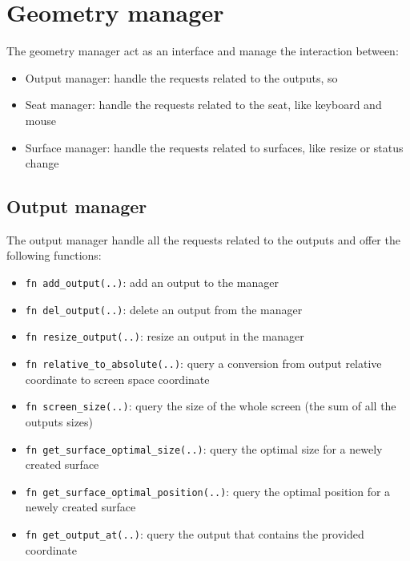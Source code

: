 \section{Geometry manager}
The geometry manager act as an interface and manage the interaction between:
\begin{itemize}
	\item Output manager: handle the requests related to the outputs, so 
	\item Seat manager: handle the requests related to the seat, like keyboard and mouse
	\item Surface manager: handle the requests related to surfaces, like resize or status change
\end{itemize}

\subsection{Output manager}
The output manager handle all the requests related to the outputs and offer the following functions:
\begin{itemize}
	\item \lstinline|fn add_output(..)|: add an output to the manager
	\item \lstinline|fn del_output(..)|: delete an output from the manager
	\item \lstinline|fn resize_output(..)|: resize an output in the manager
	\item \lstinline|fn relative_to_absolute(..)|: query a conversion from output relative coordinate to screen space coordinate
	\item \lstinline|fn screen_size(..)|: query the size of the whole screen (the sum of all the outputs sizes)
	\item \lstinline|fn get_surface_optimal_size(..)|: query the optimal size for a newely created surface
	\item \lstinline|fn get_surface_optimal_position(..)|: query the optimal position for a newely created surface
	\item \lstinline|fn get_output_at(..)|: query the output that contains the provided coordinate
\end{itemize}

